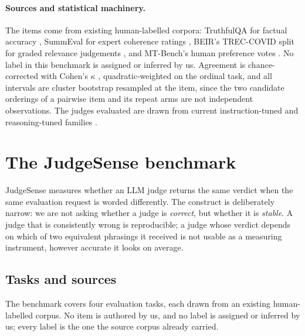 \documentclass[11pt]{article}          %
\begin{document}
\paragraph{Sources and statistical machinery.}
The items come from existing human-labelled corpora: TruthfulQA for factual
accuracy \citep{lin2022truthfulqa}, SummEval for expert coherence ratings
\citep{fabbri2021summeval}, BEIR's TREC-COVID split for graded relevance
judgements \citep{thakur2021beir}, and MT-Bench's human preference votes
\citep{zheng2023judging}. No label in this benchmark is assigned or inferred by
us. Agreement is chance-corrected with Cohen's $\kappa$
\citep{cohen1960coefficient}, quadratic-weighted on the ordinal task, and all
intervals are cluster bootstrap \citep{efron1979bootstrap} resampled at the item,
since the two candidate orderings of a pairwise item and its repeat arms are not
independent observations. The judges evaluated are drawn from current
instruction-tuned and reasoning-tuned families \citep{openai2023gpt4,
gemini2023gemini, grattafiori2024llama3, qwen2024qwen25, jiang2023mistral,
deepseek2025r1}.
\section{The JudgeSense benchmark}
\label{sec:benchmark}

JudgeSense measures whether an LLM judge returns the same verdict when the same
evaluation request is worded differently. The construct is deliberately narrow:
we are not asking whether a judge is \emph{correct}, but whether it is
\emph{stable}. A judge that is consistently wrong is reproducible; a judge whose
verdict depends on which of two equivalent phrasings it received is not usable as
a measuring instrument, however accurate it looks on average.

\subsection{Tasks and sources}
\label{sec:sources}

The benchmark covers four evaluation tasks, each drawn from an existing
human-labelled corpus. No item is authored by us, and no label is assigned or
inferred by us; every label is the one the source corpus already carried.
\end{document}
